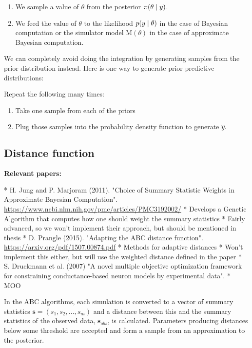 \begin{enumerate}
    \item We sample a value of $\theta$ from the posterior $\pi \qty(\theta \mid y)$. 
    \item We feed the value of $\theta$ to the likelihood $p \qty(y \mid \theta)$ in the case of Bayesian computation or the simulator model $\mathrm{M}(\theta)$ in the case of approximate Bayesian computation. 
\end{enumerate}


We can completely avoid doing the integration by generating samples from the prior distribution instead. Here is one way to generate prior predictive distributions: 

Repeat the following many times: 

\begin{enumerate}
    \item Take one sample from each of the priors
    \item Plug those samples into the probability density function to generate $\hat{y}$.
\end{enumerate}


\subsection{Distance function}

\textbf{Relevant papers:}

* H. Jung and P. Marjoram (2011). "Choice of Summary Statistic Weights in Approximate Bayesian Computation". \url{https://www.ncbi.nlm.nih.gov/pmc/articles/PMC3192002/}
    * Develops a Genetic Algorithm that computes how one should weight the summary statistics 
    * Fairly advanced, so we won't implement their approach, but should be mentioned in thesis
* D. Prangle (2015). "Adapting the ABC distance function". \url{https://arxiv.org/pdf/1507.00874.pdf}
    * Methods for adaptive distances
    * Won't implement this either, but will use the weighted distance defined in the paper
* S. Druckmann et al. (2007) "A novel multiple objective optimization framework for constraining conductance-based neuron models by experimental data". 
    * MOO
    
    
In the ABC algorithms, each simulation is converted to a vector of summary statistics $\mathbf{s} = (s_1, s_2, ..., s_m)$ and a distance between this and the summary statistics of the observed data, $\mathbf{s}_{obs}$, is calculated. Parameters producing distances below some threshold are accepted and form a sample from an approximation to the posterior. 

